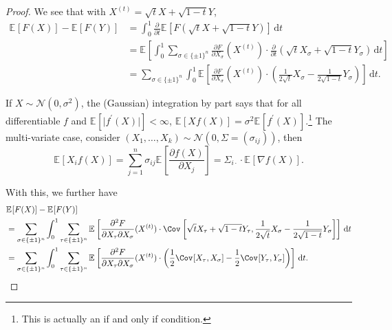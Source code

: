 \begin{proof}
	We see that with \(X^{(t)} = \sqrt{t} X + \sqrt{1 - t} Y\),
	\[
		\begin{split}
			\mathbb{E}_{}[F(X)] - \mathbb{E}_{}[F(Y)]
			 & = \int_{0}^{1} \frac{\partial }{\partial t} \mathbb{E}_{}[F(\sqrt{t} X + \sqrt{1 - t} Y)] \,\mathrm{d}t                                                                                                                           \\
			 & = \mathbb{E}_{}\left[\int_{0}^{1} \sum_{\sigma \in \{ \pm 1 \} ^n} \frac{\partial F}{\partial X_\sigma } (X^{(t)}) \cdot \frac{\partial }{\partial t} (\sqrt{t} X_\sigma + \sqrt{1 - t} Y_\sigma ) \,\mathrm{d}t \right]          \\
			 & = \sum_{\sigma \in \{ \pm 1 \} ^n} \int_{0}^{1} \mathbb{E}_{}\left[ \frac{\partial F}{\partial X_\sigma } (X^{(t)}) \cdot \left( \frac{1}{2 \sqrt{t} }X_\sigma - \frac{1}{2 \sqrt{1 - t} } Y_\sigma \right) \right]\,\mathrm{d}t.
		\end{split}
	\]

	\begin{claim}
		If \(X \sim \mathcal{N} (0, \sigma ^2)\), the (Gaussian) integration by part says that for all differentiable \(f\) and \(\mathbb{E}_{}[\lvert f^{\prime} (X) \rvert ] < \infty \), \(\mathbb{E}_{}[Xf(X)] = \sigma ^2 \mathbb{E}_{}[f^{\prime} (X)]\).\footnote{This is actually an if and only if condition.} The multi-variate case, consider \((X_1, \dots , X_k) \sim \mathcal{N} (0, \Sigma = (\sigma _{ij}))\), then
		\[
			\mathbb{E}_{}[X_i f(X)]
			= \sum_{j=1}^{n} \sigma _{ij} \mathbb{E}_{}\left[\frac{\partial f(X)}{\partial X_j} \right]
			= \Sigma _{i \cdot} \cdot \mathbb{E}_{}[\nabla f(X)] .
		\]
	\end{claim}

	With this, we further have
	\[
		\begin{split}
			 & \mathbb{E}_{}[F(X)] - \mathbb{E}_{}[F(Y)]                                                                                                                                                                                                                                                                                         \\
			 & = \sum_{\sigma \in \{ \pm 1 \} ^n} \int_{0}^{1} \sum_{\tau \in \{ \pm 1 \} ^n} \mathbb{E}_{}\left[ \frac{\partial ^2 F}{\partial X_\tau \partial X_\sigma } (X^{(t)}) \cdot \Cov_{}\left[ \sqrt{t} X_\tau + \sqrt{1 - t} Y_\tau , \frac{1}{2 \sqrt{t} }X_\sigma - \frac{1}{2 \sqrt{1 - t} } Y_\sigma \right] \right]\,\mathrm{d}t \\
			 & = \sum_{\sigma \in \{ \pm 1 \} ^n} \int_{0}^{1} \sum_{\tau \in \{ \pm 1 \} ^n} \mathbb{E}_{}\left[ \frac{\partial ^2 F}{\partial X_\tau \partial X_\sigma } (X^{(t)}) \cdot \left( \frac{1}{2} \Cov_{}[X_\tau , X_\sigma ] - \frac{1}{2} \Cov_{}[Y_\tau , Y_\sigma ] \right) \right]\,\mathrm{d}t.
		\end{split}
	\]
\end{proof}

